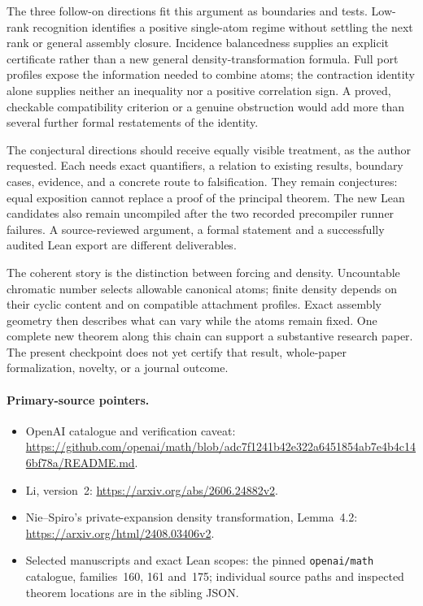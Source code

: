 The three follow-on directions fit this argument as boundaries and tests.
Low-rank recognition identifies a positive single-atom regime without
settling the next rank or general assembly closure.  Incidence
balancedness supplies an explicit certificate rather than a new general
density-transformation formula.  Full port profiles expose the information
needed to combine atoms; the contraction identity alone supplies neither
an inequality nor a positive correlation sign.  A proved, checkable
compatibility criterion or a genuine obstruction would add more than
several further formal restatements of the identity.

The conjectural directions should receive equally visible treatment, as
the author requested.  Each needs exact quantifiers, a relation to existing
results, boundary cases, evidence, and a concrete route to falsification.
They remain conjectures: equal exposition cannot replace a proof of the
principal theorem.  The new Lean candidates also remain uncompiled after
the two recorded precompiler runner failures.  A source-reviewed argument,
a formal statement and a successfully audited Lean export are different
deliverables.

The coherent story is the distinction between forcing and density.
Uncountable chromatic number selects allowable canonical atoms; finite
density depends on their cyclic content and on compatible attachment
profiles.  Exact assembly geometry then describes what can vary while
the atoms remain fixed.  One complete new theorem along this chain can
support a substantive research paper.  The present checkpoint does not
yet certify that result, whole-paper formalization, novelty, or a journal
outcome.

\paragraph{Primary-source pointers.}
\begin{itemize}
\item OpenAI catalogue and verification caveat:
\url{https://github.com/openai/math/blob/adc7f1241b42e322a6451854ab7e4b4c146bf78a/README.md}.
\item Li, version~2:
\url{https://arxiv.org/abs/2606.24882v2}.
\item Nie--Spiro's private-expansion density transformation, Lemma~4.2:
\url{https://arxiv.org/html/2408.03406v2}.
\item Selected manuscripts and exact Lean scopes: the pinned
\texttt{openai/math} catalogue, families~160, 161 and~175; individual
source paths and inspected theorem locations are in the sibling JSON.
\end{itemize}
